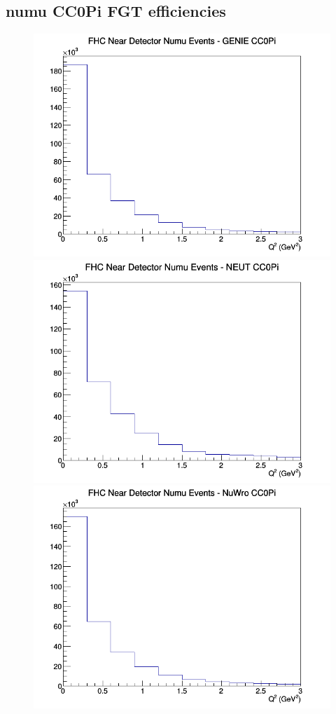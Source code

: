 \documentclass[12pt]{article}
\begin{document}
\subsection{numu CC0Pi FGT efficiencies}
\begin{figure}[h]
\includegraphics[width=\linewidth]{eff_Q2/FGT/CC0Pi_FHC_ND_numu_Q2_GENIE.png}
\endminipage
{}
\includegraphics[width=\linewidth]{eff_Q2/FGT/CC0Pi_FHC_ND_numu_Q2_NEUT.png}
\endminipage
{}
\includegraphics[width=\linewidth]{eff_Q2/FGT/CC0Pi_FHC_ND_numu_Q2_NuWro.png}

\end{figure}
\end{document}
